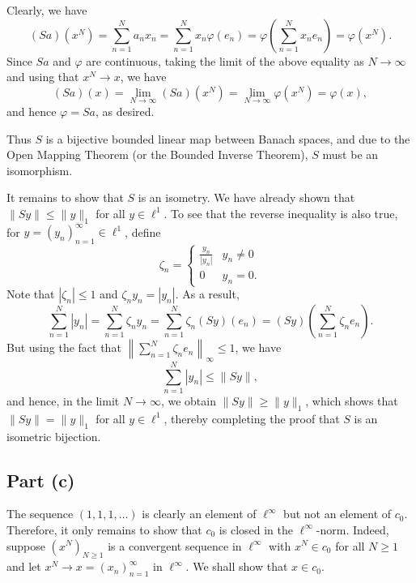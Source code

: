 \documentclass[11pt]{article}
\theoremstyle{thmstyle}
\theoremstyle{defstyle}
\renewcommand{\le}{\leqslant}
\renewcommand{\ge}{\geqslant}
\begin{document}
Clearly, we have 
\begin{equation*}
    (Sa)(x^N) = \sum_{n = 1}^N a_n x_n = \sum_{n = 1}^N x_n\varphi(e_n) = \varphi\left(\sum_{n = 1}^N x_n e_n\right) = \varphi(x^N).
\end{equation*}
Since $Sa$ and $\varphi$ are continuous, taking the limit of the above equality as $N\to\infty$ and using that $x^N\to x$, we have 
\begin{equation*}
    (Sa)(x) = \lim_{N\to\infty} (Sa)(x^N) = \lim_{N\to\infty}\varphi(x^N) = \varphi(x),
\end{equation*}
and hence $\varphi = Sa$, as desired. 

Thus $S$ is a bijective bounded linear map between Banach spaces, and due to the Open Mapping Theorem (or the Bounded Inverse Theorem), $S$ must be an isomorphism.

It remains to show that $S$ is an isometry. We have already shown that $\|Sy\|\le \|y\|_1$ for all $y\in\ell^1$. To see that the reverse inequality is also true, for $y = (y_n)_{n = 1}^\infty\in\ell^1$, define 
\begin{equation*}
    \zeta_n = 
    \begin{cases}
        \frac{y_n}{|y_n|} & y_n\ne 0\\
        0 & y_n = 0.
    \end{cases}
\end{equation*}
Note that $|\zeta_n|\le 1$ and $\zeta_ny_n = |y_n|$. As a result, 
\begin{equation*}
    \sum_{n = 1}^N |y_n| = \sum_{n = 1}^N \zeta_n y_n = \sum_{n = 1}^N \zeta_n (Sy)(e_n) = (Sy)\left(\sum_{n = 1}^N\zeta_n e_n\right).
\end{equation*}
But using the fact that $\left\|\displaystyle\sum_{n = 1}^N \zeta_n e_n\right\|_\infty\le 1$, we have 
\begin{equation*}
    \sum_{n = 1}^N |y_n|\le \|Sy\|,
\end{equation*}
and hence, in the limit $N\to\infty$, we obtain $\|Sy\|\ge \|y\|_1$, which shows that $\|Sy\| = \|y\|_1$ for all $y\in\ell^1$, thereby completing the proof that $S$ is an isometric bijection. 

\subsection{Part (c)}

The sequence $(1, 1, 1, \dots)$ is clearly an element of $\ell^\infty$ but not an element of $c_0$. Therefore, it only remains to show that $c_0$ is closed in the $\ell^\infty$-norm. Indeed, suppose $(x^N)_{N\ge 1}$ is a convergent sequence in $\ell^\infty$ with $x^N\in c_0$ for all $N\ge 1$ and let $x^N\to x = (x_n)_{n = 1}^\infty$ in $\ell^\infty$. We shall show that $x\in c_0$.
\end{document}

